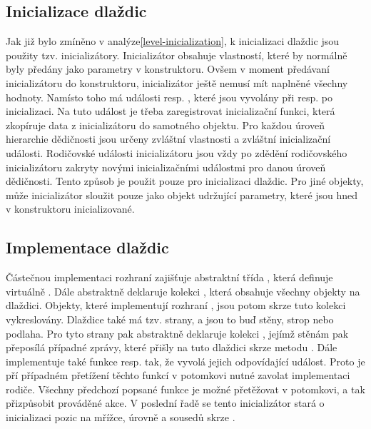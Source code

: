 \subsection{Inicializace dlaždic}
Jak již bylo zmíněno v analýze\vref{level-inicialization}, k inicializaci dlaždic jsou použity tzv. inicializátory. Inicializátor
obsahuje vlastností, které by normálně byly předány jako parametry v konstruktoru. Ovšem v moment předávaní
inicializátoru do konstruktoru, inicializátor ještě nemusí mít naplněné všechny hodnoty. Namísto toho má události 
resp. , které jsou vyvolány při resp. po inicializaci. Na tuto událost je třeba zaregistrovat
inicializační funkci, která zkopíruje data z inicializátoru do samotného objektu. Pro každou úroveň hierarchie
dědičnosti jsou určeny zvláštní vlastnosti a zvláštní inicializační události. Rodičovské události  inicializátoru jsou vždy
po zdědění rodičovského inicializátoru zakryty novými inicializačními událostmi pro danou úroveň dědičnosti.
Tento způsob je použit pouze pro inicializaci dlaždic. Pro jiné objekty, může inicializátor sloužit pouze jako 
objekt udržující parametry, které jsou hned v konstruktoru inicializované. 

\subsection{Implementace dlaždic}
Částečnou implementaci rozhraní  zajišťuje abstraktní třída , která definuje virtuálně .
Dále abstraktně deklaruje kolekci , která obsahuje všechny objekty na dlaždici. Objekty, které 
implementují rozhraní , jsou potom skrze tuto kolekci vykreslovány.
Dlaždice také má tzv. strany, a jsou to buď stěny, strop nebo podlaha.
Pro tyto strany pak abstraktně deklaruje kolekci , jejímž stěnám pak přeposílá
případné zprávy, které přišly na tuto dlaždici skrze metodu .
Dále implementuje také funkce  resp.  tak, že vyvolá jejich odpovídající událost.
Proto je pří případném přetížení těchto funkcí v potomkovi nutné zavolat implementaci rodiče. Všechny
předchozí popsané funkce je možné přetěžovat v potomkovi, a tak přizpůsobit prováděné akce.
V poslední řadě se tento inicializátor stará o inicializaci pozic na mřížce, úrovně a sousedů skrze . 

